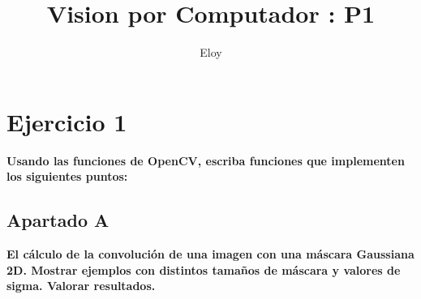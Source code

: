 \documentclass{article}
\title{Vision por Computador : P1}
\author{Eloy}
\begin{document}
\maketitle
\newpage

\section*{Ejercicio 1}
\textbf{Usando las funciones de OpenCV, escriba funciones que implementen los siguientes puntos:}
\subsection*{Apartado A}
\textbf{El cálculo de la convolución de una imagen con una máscara Gaussiana 2D.
Mostrar ejemplos con distintos tamaños de máscara y valores de sigma. Valorar
resultados.}
\end{document}
